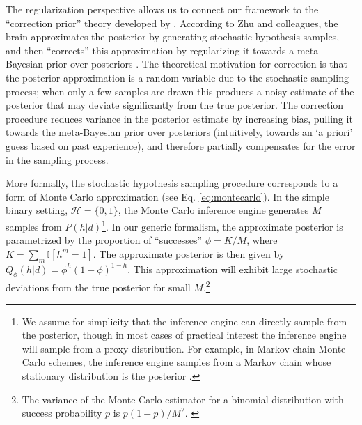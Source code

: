 The regularization perspective allows us to connect our framework to the ``correction prior'' theory developed by \citet{zhu_sanborn_chater_2018}. According to Zhu and colleagues, the brain approximates the posterior by generating stochastic hypothesis samples, and then ``corrects'' this approximation by regularizing it towards a meta-Bayesian prior over posteriors \citep[see also][]{rasmussen2003baysian}. The theoretical motivation for correction is that the posterior approximation is a random variable due to the stochastic sampling process; when only a few samples are drawn \citep[cf.][]{vul2014one,dasgupta2017hypotheses} this produces a noisy estimate of the posterior that may deviate significantly from the true posterior. The correction procedure reduces variance in the posterior estimate by increasing bias, pulling it towards the meta-Bayesian prior over posteriors (intuitively, towards an `a priori' guess based on past experience), and therefore partially compensates for the error in the sampling process.

More formally, the stochastic hypothesis sampling procedure corresponds to a form of Monte Carlo approximation (see Eq. \ref{eq:montecarlo}). In the simple binary setting, $\mathcal{H} = \{0,1\}$, the Monte Carlo inference engine generates $M$ samples from $P(h|d)$\footnote{We assume for simplicity that the inference engine can directly sample from the posterior, though in most cases of practical interest the inference engine will sample from a proxy distribution. For example, in Markov chain Monte Carlo schemes, the inference engine samples from a Markov chain whose stationary distribution is the posterior \citep{dasgupta2017hypotheses,gershman2012multistability}.}. In our generic formalism, the approximate posterior is parametrized by the proportion of ``successes'' $\phi = K/M$, where $K = \sum_{m} \mathbb{I}[h^m=1]$. The approximate posterior is then given by $Q_\phi(h|d) = \phi^h (1-\phi)^{1-h}$. This approximation will exhibit large stochastic deviations from the true posterior for small $M$.\footnote{The variance of the Monte Carlo estimator for a binomial distribution with success probability $p$ is $p(1-p)/M^2$. \label{binom}}

